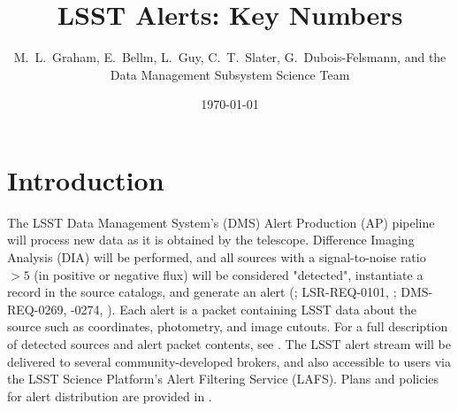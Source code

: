 \documentclass[DM,authoryear,toc]{lsstdoc}
\title[Alerts Key Numbers]{LSST Alerts: Key Numbers}
\author{%
M.~L.~Graham, E.~Bellm, L.~Guy, C.~T.~Slater, G.~Dubois-Felsmann, and the Data Management Subsystem Science Team
}
\date{\today}
\begin{document}
\maketitle

\section{Introduction} \label{sec:intro}

The LSST Data Management System's (DMS) Alert Production (AP) pipeline will process new data as it is obtained by the telescope. Difference Imaging Analysis (DIA) will be performed, and all sources with a signal-to-noise ratio $>5$ (in positive or negative flux) will be considered "detected", instantiate a record in the source catalogs, and generate an alert (; LSR-REQ-0101, ; DMS-REQ-0269, -0274, ). Each alert is a packet containing LSST data about the source such as coordinates, photometry, and image cutouts. For a full description of detected sources and alert packet contents, see . The LSST alert stream will be delivered to several community-developed brokers, and also accessible to users via the LSST Science Platform's Alert Filtering Service (LAFS). Plans and policies for alert distribution are provided in . 
\end{document}
